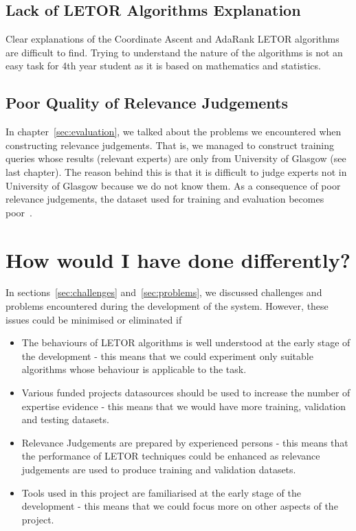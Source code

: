 \subsection{Lack of LETOR Algorithms Explanation}
Clear explanations of the Coordinate Ascent and AdaRank LETOR algorithms are difficult to find. Trying to understand the nature of 
the algorithms is not an easy task for 4th year student as it is based on mathematics and statistics.

\subsection{Poor Quality of Relevance Judgements}
In chapter~\ref{sec:evaluation}, we talked about the problems we encountered when constructing relevance judgements. That is,
we managed to construct training queries whose results (relevant experts) are only from University of Glasgow (see last chapter). 
The reason behind this is that it is difficult to judge experts not in University of Glasgow because we do not know them.
As a consequence of poor relevance judgements, the dataset used for training and evaluation becomes poor~\cite{craig}.


\section{How would I have done differently?}
In sections~\ref{sec:challenges} and~\ref{sec:problems}, we discussed challenges and problems encountered during the development of the system.
However, these issues could be minimised or eliminated if 
\begin{itemize}
 \item The behaviours of LETOR algorithms is well understood at the early stage of the development - this means that we could experiment only 
 suitable algorithms whose behaviour is applicable to the task.
 \item Various funded projects datasources should be used to increase the number of expertise evidence - this means that we would have more training, 
 validation and testing datasets.
 \item Relevance Judgements are prepared by experienced persons - this means that the performance of LETOR techniques could be enhanced as relevance judgements
 are used to produce training and validation datasets.
 \item Tools used in this project are familiarised at the early stage of the development - this means that we could focus more on other aspects of the 
 project.
\end{itemize}


